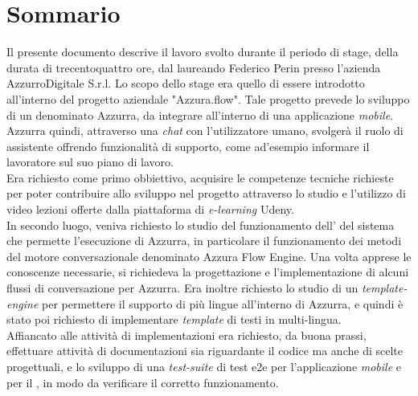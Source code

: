 
\cleardoublepage
{}
{}
\begingroup
\let\clearpage\relax
\let\cleardoublepage\relax
\let\cleardoublepage\relax

\chapter*{Sommario}

Il presente documento descrive il lavoro svolto durante il periodo di stage, della durata di trecentoquattro ore, dal laureando Federico Perin presso l'azienda AzzurroDigitale S.r.l.
Lo scopo dello stage era quello di essere introdotto all'interno del progetto aziendale "Azzura.flow". Tale progetto prevede lo sviluppo di un  denominato Azzurra, da integrare all'interno di una applicazione \emph{mobile}. Azzurra quindi, attraverso una \emph{chat} con l'utilizzatore umano, svolgerà il ruolo di assistente offrendo funzionalità di supporto, come ad'esempio informare il lavoratore sul suo piano di lavoro. \\
 Era richiesto come primo obbiettivo, acquisire le competenze tecniche richieste per poter contribuire allo sviluppo nel progetto attraverso lo studio e l'utilizzo di video lezioni offerte dalla piattaforma di \emph{e-learning} Udeny.\\
  In secondo luogo, veniva richiesto lo studio del funzionamento dell' del sistema che permette l'esecuzione di Azzurra, in particolare il funzionamento dei metodi del motore conversazionale denominato Azzura Flow Engine. Una volta apprese le conoscenze necessarie, si richiedeva la progettazione e l'implementazione di alcuni flussi di conversazione per Azzurra. Era inoltre richiesto lo studio di un \emph{template-engine} per permettere il supporto di più lingue all'interno di Azzurra, e quindi è stato poi richiesto di implementare \emph{template} di testi in multi-lingua. \\
   Affiancato alle attività di implementazioni era richiesto, da buona prassi, effettuare attività di documentazioni sia riguardante il codice ma anche di scelte progettuali, e lo sviluppo di una \emph{test-suite} di \gls{test e2e} per l'applicazione \emph{mobile} e per il , in modo da verificare il corretto funzionamento.




%
%

\endgroup			

\vfill

